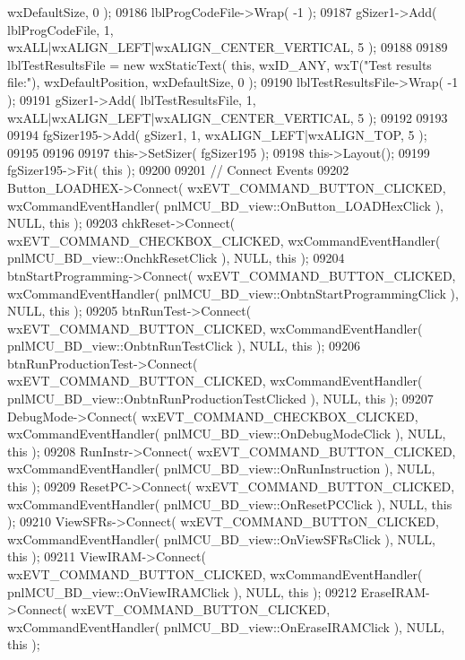 \begin{DoxyCode}
      wxDefaultSize, 0 );
09186     lblProgCodeFile->Wrap( -1 );
09187     gSizer1->Add( lblProgCodeFile, 1, wxALL|wxALIGN\_LEFT|wxALIGN\_CENTER\_VERTICAL, 5 );
09188     
09189     lblTestResultsFile = \textcolor{keyword}{new} wxStaticText( \textcolor{keyword}{this}, wxID\_ANY, wxT(\textcolor{stringliteral}{"Test results file:"}), wxDefaultPosition, 
      wxDefaultSize, 0 );
09190     lblTestResultsFile->Wrap( -1 );
09191     gSizer1->Add( lblTestResultsFile, 1, wxALL|wxALIGN\_LEFT|wxALIGN\_CENTER\_VERTICAL, 5 );
09192     
09193     
09194     fgSizer195->Add( gSizer1, 1, wxALIGN\_LEFT|wxALIGN\_TOP, 5 );
09195     
09196     
09197     this->SetSizer( fgSizer195 );
09198     this->Layout();
09199     fgSizer195->Fit( \textcolor{keyword}{this} );
09200     
09201     \textcolor{comment}{// Connect Events}
09202     Button_LOADHEX->Connect( wxEVT\_COMMAND\_BUTTON\_CLICKED, wxCommandEventHandler( 
      pnlMCU_BD_view::OnButton_LOADHexClick ), NULL, \textcolor{keyword}{this} );
09203     chkReset->Connect( wxEVT\_COMMAND\_CHECKBOX\_CLICKED, wxCommandEventHandler( 
      pnlMCU_BD_view::OnchkResetClick ), NULL, \textcolor{keyword}{this} );
09204     btnStartProgramming->Connect( wxEVT\_COMMAND\_BUTTON\_CLICKED, wxCommandEventHandler( 
      pnlMCU_BD_view::OnbtnStartProgrammingClick ), NULL, \textcolor{keyword}{this} );
09205     btnRunTest->Connect( wxEVT\_COMMAND\_BUTTON\_CLICKED, wxCommandEventHandler( 
      pnlMCU_BD_view::OnbtnRunTestClick ), NULL, \textcolor{keyword}{this} );
09206     btnRunProductionTest->Connect( wxEVT\_COMMAND\_BUTTON\_CLICKED, wxCommandEventHandler( 
      pnlMCU_BD_view::OnbtnRunProductionTestClicked ), NULL, \textcolor{keyword}{this} );
09207     DebugMode->Connect( wxEVT\_COMMAND\_CHECKBOX\_CLICKED, wxCommandEventHandler( 
      pnlMCU_BD_view::OnDebugModeClick ), NULL, \textcolor{keyword}{this} );
09208     RunInstr->Connect( wxEVT\_COMMAND\_BUTTON\_CLICKED, wxCommandEventHandler( 
      pnlMCU_BD_view::OnRunInstruction ), NULL, \textcolor{keyword}{this} );
09209     ResetPC->Connect( wxEVT\_COMMAND\_BUTTON\_CLICKED, wxCommandEventHandler( 
      pnlMCU_BD_view::OnResetPCClick ), NULL, \textcolor{keyword}{this} );
09210     ViewSFRs->Connect( wxEVT\_COMMAND\_BUTTON\_CLICKED, wxCommandEventHandler( 
      pnlMCU_BD_view::OnViewSFRsClick ), NULL, \textcolor{keyword}{this} );
09211     ViewIRAM->Connect( wxEVT\_COMMAND\_BUTTON\_CLICKED, wxCommandEventHandler( 
      pnlMCU_BD_view::OnViewIRAMClick ), NULL, \textcolor{keyword}{this} );
09212     EraseIRAM->Connect( wxEVT\_COMMAND\_BUTTON\_CLICKED, wxCommandEventHandler( 
      pnlMCU_BD_view::OnEraseIRAMClick ), NULL, \textcolor{keyword}{this} );

\end{DoxyCode}
